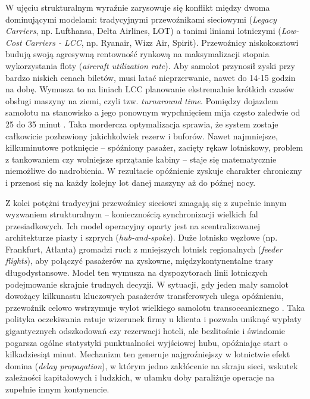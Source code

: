 W ujęciu strukturalnym wyraźnie zarysowuje się konflikt między dwoma dominującymi modelami: tradycyjnymi przewoźnikami sieciowymi (\textit{Legacy Carriers}, np. Lufthansa, Delta Airlines, LOT) a tanimi liniami lotniczymi (\textit{Low-Cost Carriers - LCC}, np. Ryanair, Wizz Air, Spirit). Przewoźnicy niskokosztowi budują swoją agresywną rentowność rynkową na maksymalizacji stopnia wykorzystania floty (\textit{aircraft utilization rate}). Aby samolot przynosił zyski przy bardzo niskich cenach biletów, musi latać nieprzerwanie, nawet do 14-15 godzin na dobę. Wymusza to na liniach LCC planowanie ekstremalnie krótkich czasów obsługi maszyny na ziemi, czyli tzw. \textit{turnaround time}. Pomiędzy dojazdem samolotu na stanowisko a jego ponownym wypchnięciem mija często zaledwie od 25 do 35 minut \cite{lcc_patterns}. Taka mordercza optymalizacja sprawia, że system zostaje całkowicie pozbawiony jakichkolwiek rezerw i buforów. Nawet najmniejsze, kilkuminutowe potknięcie – spóźniony pasażer, zacięty rękaw lotniskowy, problem z tankowaniem czy wolniejsze sprzątanie kabiny – staje się matematycznie niemożliwe do nadrobienia. W rezultacie opóźnienie zyskuje charakter chroniczny i przenosi się na każdy kolejny lot danej maszyny aż do późnej nocy. 

Z kolei potężni tradycyjni przewoźnicy sieciowi zmagają się z zupełnie innym wyzwaniem strukturalnym – koniecznością synchronizacji wielkich fal przesiadkowych. Ich model operacyjny oparty jest na scentralizowanej architekturze piasty i szprych (\textit{hub-and-spoke}). Duże lotnisko węzłowe (np. Frankfurt, Atlanta) gromadzi ruch z mniejszych lotnisk regionalnych (\textit{feeder flights}), aby połączyć pasażerów na zyskowne, międzykontynentalne trasy długodystansowe. Model ten wymusza na dyspozytorach linii lotniczych podejmowanie skrajnie trudnych decyzji. W sytuacji, gdy jeden mały samolot dowożący kilkunastu kluczowych pasażerów transferowych ulega opóźnieniu, przewoźnik celowo wstrzymuje wylot wielkiego samolotu transoceanicznego \cite{propagation2009}. Taka polityka oczekiwania ratuje wizerunek firmy u klienta i pozwala uniknąć wypłaty gigantycznych odszkodowań czy rezerwacji hoteli, ale bezlitośnie i świadomie pogarsza ogólne statystyki punktualności wyjściowej hubu, opóźniając start o kilkadziesiąt minut. Mechanizm ten generuje najgroźniejszy w lotnictwie efekt domina (\textit{delay propagation}), w którym jedno zakłócenie na skraju sieci, wskutek zależności kapitałowych i ludzkich, w ułamku doby paraliżuje operacje na zupełnie innym kontynencie.

